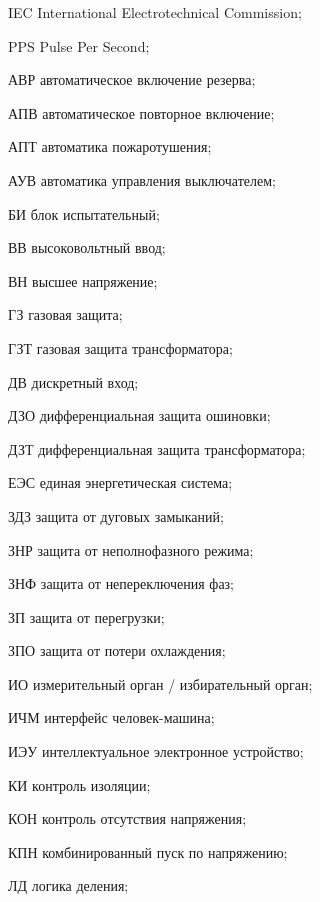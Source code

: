 \begin{list}{}%
{%
  \setlength{\labelwidth}{\abbrwidth}%
  \setlength{\labelsep}{0pt}%
  \setlength{\leftmargin}{\dimexpr\labelwidth+\labelsep\relax}%
  \setlength{\itemindent}{0pt}%
  \setlength{\parsep}{0pt}%
  \setlength{\itemsep}{0pt}
  \renewcommand{\makelabel}[1]{#1 --\hspace{\abbrgap}}%
}
\item[IEC]  International Electrotechnical Commission;
\item[PPS] Pulse Per Second;
\item[АВР] автоматическое включение резерва;
\item[АПВ] автоматическое повторное включение;
\item[АПТ] автоматика пожаротушения;
\item[АУВ] автоматика управления выключателем;
\item[БИ] блок испытательный;
\item[ВВ] высоковольтный ввод;
\item[ВН] высшее напряжение;
\item[ГЗ] газовая защита;
\item[ГЗТ] газовая защита трансформатора;
\item[ДВ] дискретный вход;
\item[ДЗО] дифференциальная защита ошиновки;
\item[ДЗТ] дифференциальная защита трансформатора;
\item[ЕЭС] единая энергетическая система;
\item[ЗДЗ] защита от дуговых замыканий;
\item[ЗНР] защита от неполнофазного режима;
\item[ЗНФ] защита от непереключения фаз;
\item[ЗП] защита от перегрузки;
\item[ЗПО] защита от потери охлаждения;
\item[ИО] измерительный орган / избирательный орган;
\item[ИЧМ] интерфейс человек-машина;
\item[ИЭУ] интеллектуальное электронное устройство;
\item[КИ] контроль изоляции;
\item[КОН] контроль отсутствия напряжения;
\item[КПН] комбинированный пуск по напряжению;
\item[ЛД] логика деления;

\end{list}
